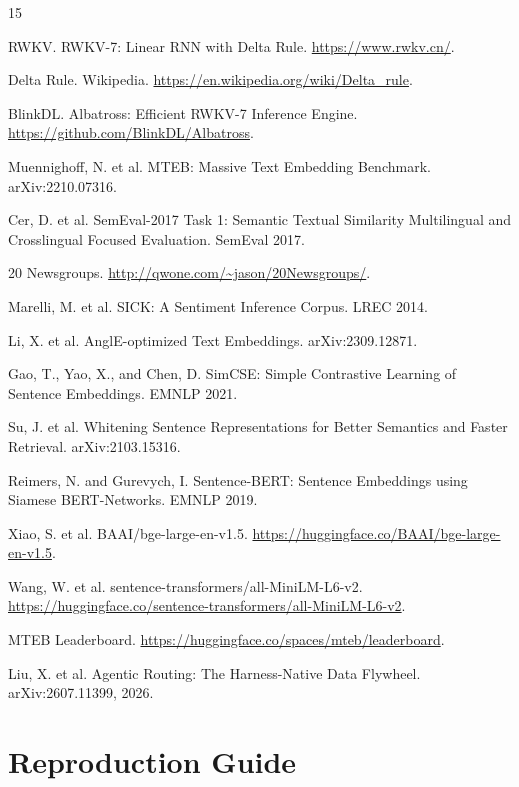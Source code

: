 \documentclass[11pt]{article}
\begin{document}
\begin{thebibliography}{15}

 RWKV. RWKV-7: Linear RNN with Delta Rule.
\url{https://www.rwkv.cn/}.

 Delta Rule. Wikipedia.
\url{https://en.wikipedia.org/wiki/Delta_rule}.

 BlinkDL. Albatross: Efficient RWKV-7 Inference Engine.
\url{https://github.com/BlinkDL/Albatross}.

 Muennighoff, N. et al. MTEB: Massive Text Embedding
Benchmark. arXiv:2210.07316.

 Cer, D. et al. SemEval-2017 Task 1: Semantic Textual
Similarity Multilingual and Crosslingual Focused Evaluation. SemEval 2017.

 20 Newsgroups.
\url{http://qwone.com/~jason/20Newsgroups/}.

 Marelli, M. et al. SICK: A Sentiment Inference Corpus.
LREC 2014.

 Li, X. et al. AnglE-optimized Text Embeddings.
arXiv:2309.12871.

 Gao, T., Yao, X., and Chen, D. SimCSE: Simple Contrastive
Learning of Sentence Embeddings. EMNLP 2021.

 Su, J. et al. Whitening Sentence Representations for
Better Semantics and Faster Retrieval. arXiv:2103.15316.

 Reimers, N. and Gurevych, I. Sentence-BERT: Sentence
Embeddings using Siamese BERT-Networks. EMNLP 2019.

 Xiao, S. et al. BAAI/bge-large-en-v1.5.
\url{https://huggingface.co/BAAI/bge-large-en-v1.5}.

 Wang, W. et al.
sentence-transformers/all-MiniLM-L6-v2.
\url{https://huggingface.co/sentence-transformers/all-MiniLM-L6-v2}.

 MTEB Leaderboard.
\url{https://huggingface.co/spaces/mteb/leaderboard}.

 Liu, X. et al. Agentic Routing: The Harness-Native
Data Flywheel. arXiv:2607.11399, 2026.

\end{thebibliography}

\appendix

\section{Reproduction Guide}
\end{document}
